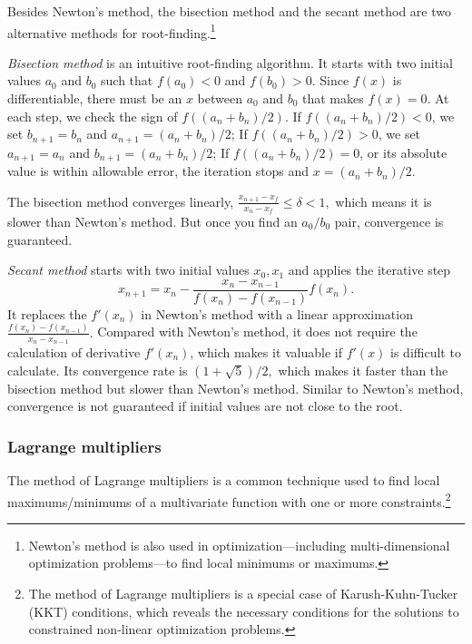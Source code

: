 \begin{solution}
Besides Newton's method, the bisection method and the secant method are two alternative methods for root-finding.\footnote[5]{Newton's method is also used in optimization---including multi-dimensional optimization problems---to find local minimums or maximums.}

\emph{Bisection method} is an intuitive root-finding algorithm. It starts with two initial values \(a_0\) and \(b_0\) such that \(f(a_0)<0\) and \(f(b_0)>0\). Since \(f(x)\) is differentiable, there must be an \(x\) between \(a_0\) and \(b_0\) that makes \(f(x)=0\). At each step, we check the sign of \(f((a_n+b_n)/2)\). If \(f((a_n+b_n)/2)<0\), we set \(b_{n+1}=b_n\) and \(a_{n+1}=(a_n+b_n)/2\); If \(f((a_n+b_n)/2)>0\), we set \(a_{n+1}=a_n\) and \(b_{n+1}=(a_n+b_n)/2\); If \(f((a_n+b_n)/2)=0\), or its absolute value is within allowable error, the iteration stops and \(x=(a_n+b_n)/2\).

The bisection method converges linearly, \(\frac{x_{n+1}-x_f}{x_n-x_f}\le\delta<1,\) which means it is slower than Newton's method. But once you find an \(a_0/b_0\) pair, convergence is guaranteed.

\emph{Secant method} starts with two initial values \(x_0,x_1\) and applies the iterative step
\[
x_{n+1}=x_n-\frac{x_n-x_{n-1}}{f(x_n)-f(x_{n-1})}f(x_n).
\]
It replaces the \(f'(x_n)\) in Newton's method with a linear approximation \(\frac{f(x_n)-f(x_{n-1})}{x_n-x_{n-1}}.\) Compared with Newton's method, it does not require the calculation of derivative \(f'(x_n)\), which makes it valuable if \(f'(x)\) is difficult to calculate. Its convergence rate is \((1+\sqrt{5})/2,\) which makes it faster than the bisection method but slower than Newton's method. Similar to Newton's method, convergence is not guaranteed if initial values are not close to the root.

\end{solution}

\subsubsection*{Lagrange multipliers}

The method of Lagrange multipliers is a common technique used to find local maximums/minimums of a multivariate function with one or more constraints.\footnote[6]{The method of Lagrange multipliers is a special case of Karush-Kuhn-Tucker (KKT) conditions, which reveals the necessary conditions for the solutions to constrained non-linear optimization problems.}


